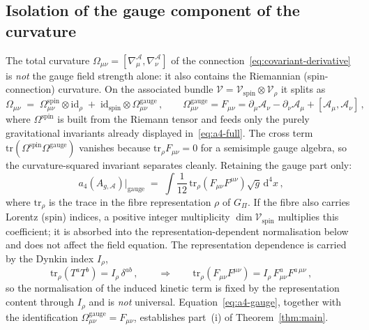 \documentclass[12pt,a4paper]{article}
\theoremstyle{remark}
\theoremstyle{plain}
\theoremstyle{definition}
\begin{document}
    \subsection{Isolation of the gauge component of the curvature}
      \label{subsec:curvature-identification}

      The total curvature $\Omega_{\mu\nu}
      = [\nabla^\mathcal{A}_\mu, \nabla^\mathcal{A}_\nu]$ of the
      connection~\eqref{eq:covariant-derivative} is \emph{not} the
      gauge field strength alone: it also contains the Riemannian
      (spin-connection) curvature. On the associated bundle
      $\mathcal{V} = \mathcal{V}_{\mathrm{spin}} \otimes
      \mathcal{V}_\rho$ it splits as
      \begin{equation}\label{eq:curvature-split}
        \Omega_{\mu\nu}
        \;=\;
        \Omega^{\mathrm{spin}}_{\mu\nu}\otimes \mathrm{id}_\rho
        \;+\;
        \mathrm{id}_{\mathrm{spin}}\otimes
        \Omega^{\mathrm{gauge}}_{\mu\nu}\,,
        \qquad
        \Omega^{\mathrm{gauge}}_{\mu\nu} = F_{\mu\nu}
        = \partial_\mu \mathcal{A}_\nu
        - \partial_\nu \mathcal{A}_\mu
        + [\mathcal{A}_\mu, \mathcal{A}_\nu]\,,
      \end{equation}
      where $\Omega^{\mathrm{spin}}$ is built from the Riemann tensor
      and feeds only the purely gravitational invariants already
      displayed in~\eqref{eq:a4-full}.
      The cross term
      $\mathrm{tr}(\Omega^{\mathrm{spin}}\Omega^{\mathrm{gauge}})$
      vanishes because $\mathrm{tr}_\rho F_{\mu\nu} = 0$ for a
      semisimple gauge algebra, so the curvature-squared invariant
      separates cleanly. Retaining the gauge part only:
      \begin{equation}\label{eq:a4-gauge}
        a_4(A_{g,\mathcal{A}})\big|_{\mathrm{gauge}}
        \;=\;
        \int
        \frac{1}{12}\,
        \mathrm{tr}_\rho(F_{\mu\nu}F^{\mu\nu})
        \sqrt{g}\,\mathrm{d}^4 x\,,
      \end{equation}
      where $\mathrm{tr}_\rho$ is the trace in the fibre representation
      $\rho$ of $G_\Pi$. If the fibre also carries Lorentz (spin)
      indices, a positive integer multiplicity $\dim\mathcal{V}_{\mathrm{spin}}$
      multiplies this coefficient; it is absorbed into the
      representation-dependent normalisation below and does not affect
      the field equation.
      The representation dependence is carried by the Dynkin index
      $I_\rho$,
      \begin{equation}\label{eq:dynkin}
        \mathrm{tr}_\rho(T^a T^b) = I_\rho\,\delta^{ab}\,,
        \qquad\Longrightarrow\qquad
        \mathrm{tr}_\rho(F_{\mu\nu}F^{\mu\nu})
        = I_\rho\, F^a_{\mu\nu}F^{a\,\mu\nu}\,,
      \end{equation}
      so the normalisation of the induced kinetic term is fixed by the
      representation content through $I_\rho$ and is \emph{not}
      universal.
      Equation~\eqref{eq:a4-gauge}, together with the identification
      $\Omega^{\mathrm{gauge}}_{\mu\nu} = F_{\mu\nu}$, establishes
      part~(i) of Theorem~\ref{thm:main}.
\end{document}
